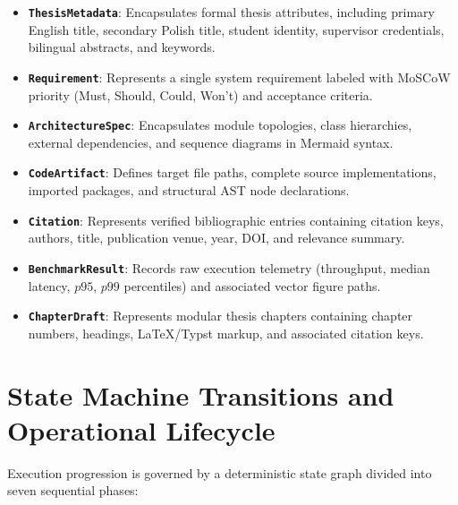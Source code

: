 \begin{itemize}
    \item \textbf{\texttt{ThesisMetadata}}: Encapsulates formal thesis attributes, including primary English title, secondary Polish title, student identity, supervisor credentials, bilingual abstracts, and keywords.
    \item \textbf{\texttt{Requirement}}: Represents a single system requirement labeled with MoSCoW priority (Must, Should, Could, Won't) and acceptance criteria.
    \item \textbf{\texttt{ArchitectureSpec}}: Encapsulates module topologies, class hierarchies, external dependencies, and sequence diagrams in Mermaid syntax.
    \item \textbf{\texttt{CodeArtifact}}: Defines target file paths, complete source implementations, imported packages, and structural AST node declarations.
    \item \textbf{\texttt{Citation}}: Represents verified bibliographic entries containing citation keys, authors, title, publication venue, year, DOI, and relevance summary.
    \item \textbf{\texttt{BenchmarkResult}}: Records raw execution telemetry (throughput, median latency, $p95$, $p99$ percentiles) and associated vector figure paths.
    \item \textbf{\texttt{ChapterDraft}}: Represents modular thesis chapters containing chapter numbers, headings, LaTeX/Typst markup, and associated citation keys.
\end{itemize}

\section{State Machine Transitions and Operational Lifecycle}
\label{sec:lifecycle}

Execution progression is governed by a deterministic state graph divided into seven sequential phases:


